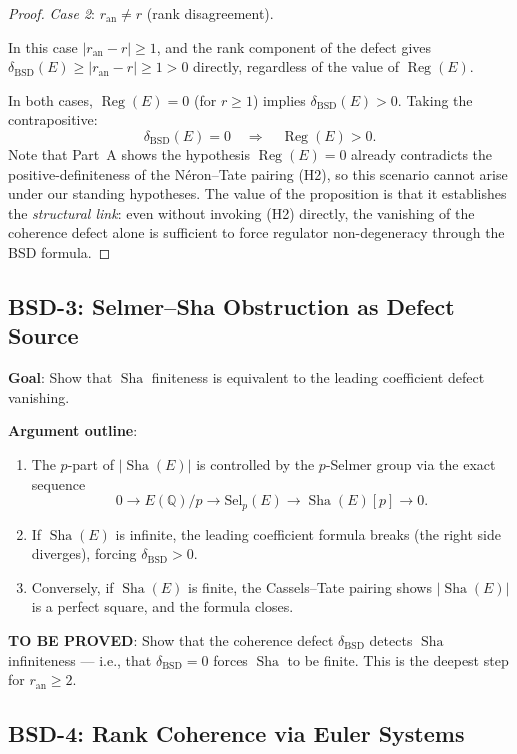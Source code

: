 \documentclass[11pt]{article}
\theoremstyle{definition}
\DeclareMathOperator{\Reg}{Reg}
\DeclareMathOperator{\Sha}{Sha}
\begin{document}
\begin{proof}
\smallskip
\noindent\emph{Case 2}: $r_{\mathrm{an}} \neq r$ (rank disagreement).
\par\noindent
In this case $|r_{\mathrm{an}} - r| \geq 1$, and the rank component of the defect
gives $\delta_{\mathrm{BSD}}(E) \geq |r_{\mathrm{an}} - r| \geq 1 > 0$ directly,
regardless of the value of $\Reg(E)$.

\medskip
In both cases, $\Reg(E) = 0$ (for $r \geq 1$) implies
$\delta_{\mathrm{BSD}}(E) > 0$.  Taking the contrapositive:
\[
  \delta_{\mathrm{BSD}}(E) = 0
  \quad\Longrightarrow\quad
  \Reg(E) > 0.
\]
Note that Part~A shows the hypothesis $\Reg(E) = 0$ already contradicts
the positive-definiteness of the N\'eron--Tate pairing (H2), so this
scenario cannot arise under our standing hypotheses.  The value of
the proposition is that it establishes the \emph{structural link}:
even without invoking (H2) directly, the vanishing of the coherence
defect alone is sufficient to force regulator non-degeneracy through
the BSD formula.
\end{proof}

\subsection{BSD-3: Selmer--Sha Obstruction as Defect Source}

\textbf{Goal}: Show that $\Sha$ finiteness is equivalent to the leading coefficient
defect vanishing.

\textbf{Argument outline}:
\begin{enumerate}
  \item The $p$-part of $|\Sha(E)|$ is controlled by the $p$-Selmer group
    via the exact sequence
    \[
      0 \to E(\mathbb{Q})/p \to \mathrm{Sel}_p(E) \to \Sha(E)[p] \to 0.
    \]
  \item If $\Sha(E)$ is infinite, the leading coefficient formula breaks
    (the right side diverges), forcing $\delta_{\mathrm{BSD}} > 0$.
  \item Conversely, if $\Sha(E)$ is finite, the Cassels--Tate pairing
    shows $|\Sha(E)|$ is a perfect square, and the formula closes.
\end{enumerate}

\textbf{TO BE PROVED}: Show that the coherence defect $\delta_{\mathrm{BSD}}$ detects
$\Sha$ infiniteness --- i.e., that $\delta_{\mathrm{BSD}} = 0$ forces $\Sha$ to be finite.
This is the deepest step for $r_{\mathrm{an}} \geq 2$.

\subsection{BSD-4: Rank Coherence via Euler Systems}
\end{document}

